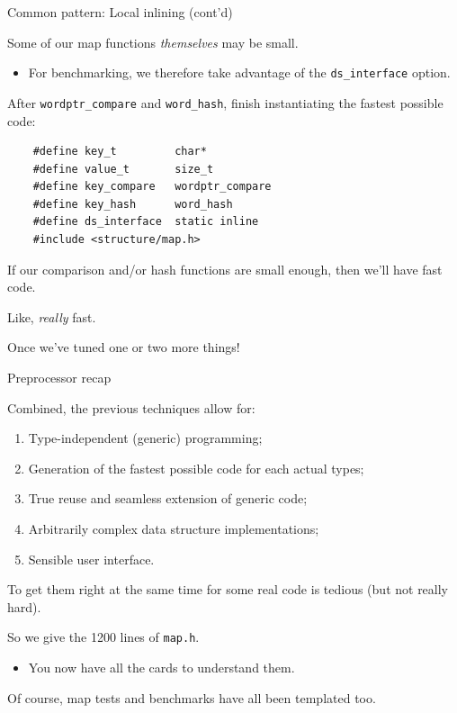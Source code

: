 \begin{frame}[fragile]{Common pattern: Local inlining (cont'd)}

  Some of our map functions {\em themselves} may be small.
  \begin{itemize}
  \item For benchmarking, we therefore take advantage of the \lstinline{ds_interface} option.
  \end{itemize}

  After \lstinline{wordptr_compare} and \lstinline{word_hash}, finish instantiating the fastest possible code:
  \begin{lstlisting}
    #define key_t         char*
    #define value_t       size_t
    #define key_compare   wordptr_compare
    #define key_hash      word_hash
    #define ds_interface  static inline
    #include <structure/map.h>
  \end{lstlisting}

  If our comparison and/or hash functions are small enough, then we'll have fast code.

  Like, {\em really} fast.

  Once we've tuned one or two more things!
  
\end{frame}

\begin{frame}[fragile]{Preprocessor recap}

  Combined, the previous techniques allow for:
  \begin{enumerate}
  \item Type-independent (generic) programming;
  \item Generation of the fastest possible code for each actual types;
  \item True reuse and seamless extension of generic code;
  \item Arbitrarily complex data structure implementations;
  \item Sensible user interface.
  \end{enumerate}

  To get them right at the same time for some real code is tedious (but not really hard).

  So we give the 1200 lines of \lstinline{map.h}.
  \begin{itemize}
  \item You now have all the cards to understand them.
  \end{itemize}

  Of course, map tests and benchmarks have all been templated too.
  
\end{frame}

